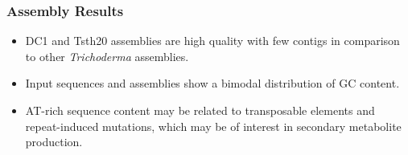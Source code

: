 \documentclass[t]{beamer}
\begin{document}
\begin{frame}
	\frametitle{Assembly Results}
	\centering
	\vspace{0.5cm}
	\begin{itemize}
		\item DC1 and Tsth20 assemblies are high quality with few contigs in comparison to other \textit{Trichoderma} assemblies.
		\item Input sequences and assemblies show a bimodal distribution of GC content.
		\item AT-rich sequence content may be related to transposable elements and repeat-induced mutations, which may be of interest in secondary metabolite production.
	\end{itemize}
\end{frame}
\end{document}
